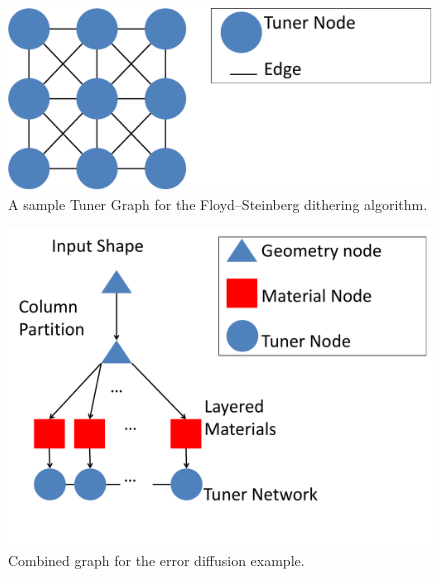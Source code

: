 \documentclass[annual]{acmsiggraph}
\begin{document}
\begin{figure}[h]
\includegraphics[scale=0.3]{figure/tuner.pdf}
\caption{A sample Tuner Graph for the Floyd–Steinberg dithering algorithm.}
\label{fig:tuner}
\end{figure}

\begin{figure}[h]
\includegraphics[scale=0.3]{figure/netAndTuner.pdf}
\caption{Combined graph for the error diffusion example.}
\label{fig:combine}
\end{figure}
\end{document}
